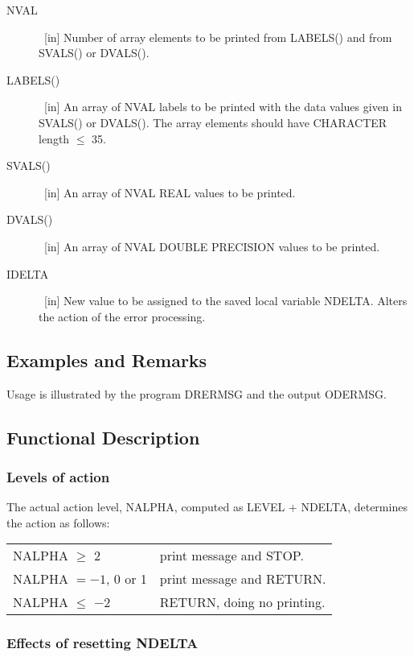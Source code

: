 \documentclass[twoside]{MATH77}
\begin{document}
\begin{description}
\item[NVAL] \ [in] Number of array elements to be printed from LABELS() and from
SVALS() or DVALS().

\item[LABELS()] \ [in] An array of NVAL labels to be printed with the data values
given in SVALS() or DVALS(). The array elements should have CHARACTER
length $\leq $ 35.

\item[SVALS()] \ [in] An array of NVAL REAL values to be printed.

\item[DVALS()] \ [in] An array of NVAL DOUBLE PRECISION values to be printed.

\item[IDELTA] \ [in] New value to be assigned to the saved local variable NDELTA.
Alters the action of the error processing.

\end{description}

\subsection{Examples and Remarks}

Usage is illustrated by the program DRERMSG and the output ODERMSG.

\subsection{Functional Description}

\subsubsection{Levels of action}

The actual action level, NALPHA, computed as LEVEL + NDELTA, determines
the action as follows:

\begin{tabular}{ll}
NALPHA $\geq $ 2 & print message and STOP.\\
NALPHA $= -1$, 0 or 1 & print message and RETURN.\\
NALPHA $\leq$ $-$2 & RETURN, doing no printing.\\
\end{tabular}

\subsubsection{Effects of resetting NDELTA}
\end{document}
